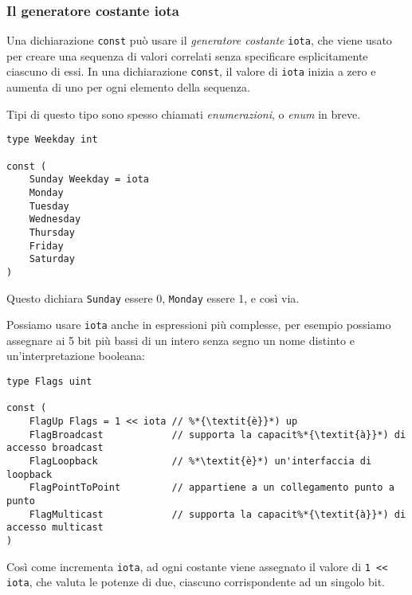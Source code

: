 \documentclass[../../../thesis.tex]{subfiles}
\begin{document}
    \subsubsection{Il generatore costante iota}
    Una dichiarazione \verb"const" può usare il \textit{generatore costante} \verb"iota", che viene usato per creare una sequenza di valori correlati senza specificare esplicitamente ciascuno di essi.
    In una dichiarazione \verb"const", il valore di \verb"iota" inizia a zero e aumenta di uno per ogni elemento della sequenza.
    \hfill \vspace{12pt}

    Tipi di questo tipo sono spesso chiamati \textit{enumerazioni}, o \textit{enum} in breve.
    \begin{lstlisting}[frame = single, label = {lst:lstlisting2-3-1.1}]
type Weekday int

const (
    Sunday Weekday = iota
    Monday
    Tuesday
    Wednesday
    Thursday
    Friday
    Saturday
)
    \end{lstlisting}
    Questo dichiara \verb"Sunday" essere 0, \verb"Monday" essere 1, e così via.
    \hfill \vspace{12pt}

    Possiamo usare \verb"iota" anche in espressioni più complesse, per esempio possiamo assegnare ai 5 bit più bassi di un intero senza segno un nome distinto e un'interpretazione booleana:
    \begin{lstlisting}[frame = single, label = {lst:lstlisting2-3-1.2}]
type Flags uint

const (
    FlagUp Flags = 1 << iota // %*{\textit{è}}*) up
    FlagBroadcast            // supporta la capacit%*{\textit{à}}*) di accesso broadcast
    FlagLoopback             // %*\textit{è}*) un'interfaccia di loopback
    FlagPointToPoint         // appartiene a un collegamento punto a punto
    FlagMulticast            // supporta la capacit%*{\textit{à}}*) di accesso multicast
)
    \end{lstlisting}
    Così come incrementa \verb"iota", ad ogni costante viene assegnato il valore di \verb"1 << iota", che valuta le potenze di due, ciascuno corrispondente ad un singolo bit.
\end{document}
